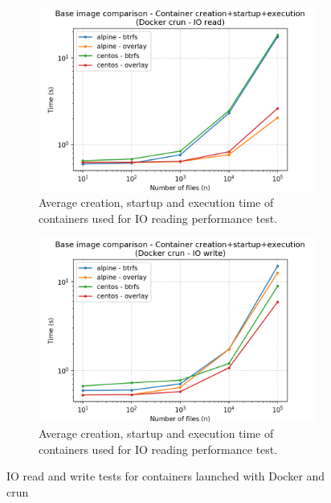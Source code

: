 \begin{figure}[!h]
    \begin{subfigure}{.5\textwidth}
      \centering
      \includegraphics[width=\linewidth]{images/image/image-full-Docker-crun---IO-read.png}
      \caption{Average creation, startup and execution time of containers used for IO reading performance test.}
      \label{fig:image:io-read-full}
    \end{subfigure}
    \begin{subfigure}{.5\textwidth}
      \centering
      \includegraphics[width=\linewidth]{images/image/image-full-Docker-crun---IO-write.png}
      \caption{Average creation, startup and execution time of containers used for IO reading performance test.}
      \label{fig:image:io-write-full}
    \end{subfigure}
    
    \caption{IO read and write tests for containers launched with Docker and crun}
\end{figure}

